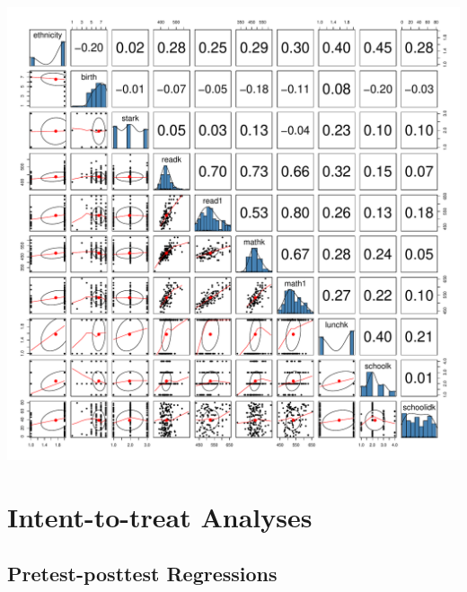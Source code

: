 \documentclass[doc]{apa6}\usepackage[]{graphicx}\usepackage[]{color}
\makeatletter
\def\maxwidth{ %
  \ifdim\Gin@nat@width>\linewidth
    \linewidth
  \else
    \Gin@nat@width
  \fi
}
\makeatother
\begin{document}
\includegraphics[width=\maxwidth]{figure/pairsplot} 


\clearpage
\section{Intent-to-treat Analyses}
\subsection{Pretest-posttest Regressions}
\end{document}

